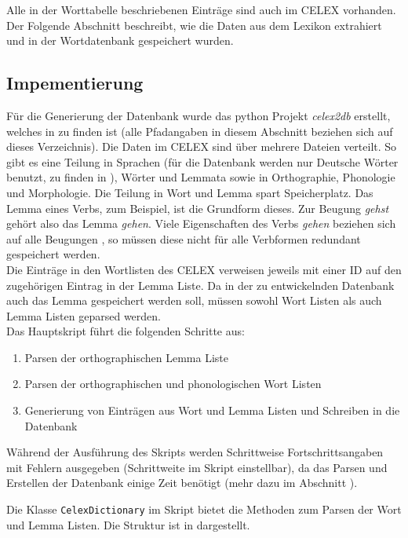 Alle in der Worttabelle beschriebenen Einträge sind auch im CELEX vorhanden. Der Folgende Abschnitt beschreibt, wie die Daten aus dem Lexikon extrahiert und in der Wortdatenbank gespeichert wurden.

\subsection{Impementierung}

Für die Generierung der Datenbank wurde das python Projekt \textit{celex2db} erstellt, welches in  zu finden ist (alle Pfadangaben in diesem Abschnitt beziehen sich auf dieses Verzeichnis). Die Daten im CELEX  sind über mehrere Dateien verteilt. So gibt es eine Teilung in Sprachen (für die Datenbank werden nur Deutsche Wörter benutzt, zu finden in ), Wörter und Lemmata sowie in Orthographie, Phonologie und Morphologie. Die Teilung in Wort und Lemma spart Speicherplatz. Das Lemma eines Verbs, zum Beispiel, ist die Grundform dieses. Zur Beugung \textit{gehst} gehört also das Lemma \textit{gehen}. Viele Eigenschaften des Verbs \textit{gehen} beziehen sich auf alle Beugungen , so müssen diese nicht für alle Verbformen redundant gespeichert werden.\\
Die Einträge in den Wortlisten des CELEX verweisen jeweils mit einer ID auf den zugehörigen Eintrag in der Lemma Liste. Da in der zu entwickelnden Datenbank auch das Lemma gespeichert werden soll, müssen sowohl Wort Listen als auch Lemma Listen geparsed werden.\\

Das Hauptskript  führt die folgenden Schritte aus:
\begin{enumerate}
	\item Parsen der orthographischen Lemma Liste
	\item Parsen der orthographischen und phonologischen Wort Listen
	\item Generierung von Einträgen aus Wort und Lemma Listen und Schreiben in die Datenbank
\end{enumerate}
Während der Ausführung des Skripts werden Schrittweise Fortschrittsangaben mit Fehlern ausgegeben (Schrittweite im Skript einstellbar), da das Parsen und Erstellen der Datenbank einige Zeit benötigt (mehr dazu im Abschnitt ).

Die Klasse \texttt{CelexDictionary} im Skript  bietet die Methoden zum Parsen der Wort und Lemma Listen. Die Struktur ist in  dargestellt.\\

